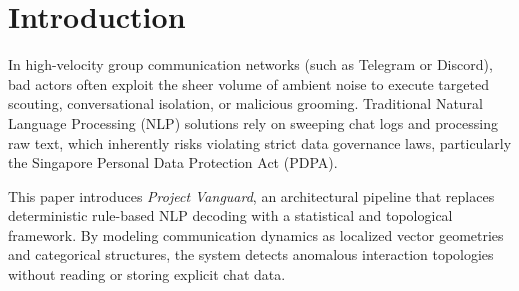 \section{Introduction}

In high-velocity group communication networks (such as Telegram or Discord), bad actors often exploit the sheer volume of ambient noise to execute targeted scouting, conversational isolation, or malicious grooming. Traditional Natural Language Processing (NLP) solutions rely on sweeping chat logs and processing raw text, which inherently risks violating strict data governance laws, particularly the Singapore Personal Data Protection Act (PDPA). 

This paper introduces \textit{Project Vanguard}, an architectural pipeline that replaces deterministic rule-based NLP decoding with a statistical and topological framework. By modeling communication dynamics as localized vector geometries and categorical structures, the system detects anomalous interaction topologies without reading or storing explicit chat data.
